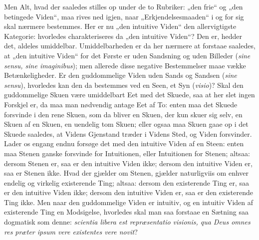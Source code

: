 \documentclass[11pt]{book}
\newcommand{\opage}[1]{\marginnote{\footnotesize\textit{[#1]}}}
\begin{document}
\opage{237} \setcounter{footnote}{0}%
Men Alt, hvad der saaledes stilles op under de to Rubriker: „den frie“
og „den betingede Viden“, maa rives ned igjen, naar
„Erkjendelsesmaaden“ i og for sig skal nærmere bestemmes. Her er nu
„den intuitive Viden“ den allervigtigste Kategorie: hvorledes
charakteriseres da „den intuitive Viden“? Den er, hedder det, aldeles
umiddelbar. Umiddelbarheden er da her nærmere at forstaae saaledes, at
„den intuitive Viden“ for det Første er uden Sandsning og uden Billeder
(\textit{sine sensu, sine imaginibus}); men allerede disse negative
Bestemmelser maae vække Betænkeligheder. Er den guddommelige Viden uden
Sands og Sandsen (\textit{sine sensu}), hvorledes kan den da bestemmes
ved en Seen, et Syn (\textit{visio})? Skal den guddommelige Skuen være
umiddelbart Eet med det Skuede, saa at her slet ingen Forskjel er, da
maa man nødvendig antage Eet af To: enten maa det Skuede forsvinde i den
rene Skuen, som da bliver en Skuen, der kun skuer sig selv, en Skuen af
en Skuen, en uendelig tom Skuen; eller ogsaa maa Skuen gaae op i det
Skuede saaledes, at Videns Gjenstand træder i Videns Sted, og Viden
forsvinder. Lader os engang endnu forsøge det med den intuitive Viden af
en Steen: enten maa Stenen ganske forsvinde for Intuitionen, eller
Intuitionen for Stenen; altsaa: dersom Stenen er, saa er den intuitive
Viden ikke; dersom den intuitive Viden er, saa er Stenen ikke. Hvad der
gjælder om Stenen, gjælder naturligviis om enhver endelig og virkelig
existerende Ting; altsaa: dersom den existerende Ting er, saa er den
intuitive Viden ikke; dersom den intuitive Viden er, saa er den
existerende Ting ikke. Men naar den guddommelige Viden er intuitiv, og
en intuitiv Viden af existerende Ting en Modsigelse, hvorledes skal man
saa forstaae en Sætning saa dogmatisk som denne: \textit{scientia libera
est repræsentatio visionis, qua Deus omnes res præter ipsum vere
existentes vere novit}?
\end{document}
